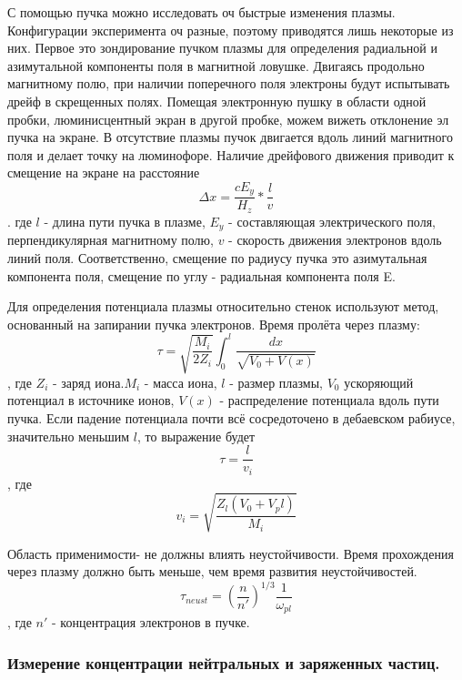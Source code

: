 \documentclass[10pt, a4paper]{article}
\begin{document}
С помощью пучка можно исследовать оч быстрые изменения плазмы. Конфигурации эксперимента оч разные, поэтому приводятся лишь некоторые из них.
Первое это зондирование пучком плазмы для определения радиальной и азимутальной компоненты поля в магнитной ловушке. Двигаясь продольно магнитному полю, при наличии поперечного поля электроны будут испытывать дрейф в скрещенных полях. Помещая электронную пушку в области одной пробки, люминисцентный экран в другой пробке, можем вижеть отклонение эл пучка на экране.
В отсутствие плазмы пучок двигается вдоль линий магнитного поля и делает точку на люминофоре. Наличие дрейфового движения приводит к смещение на экране на расстояние
\begin{equation}
	\Delta x=\frac{cE_y}{H_z} * \frac{l}{v}
\end{equation}
. где $l$ - длина пути пучка в плазме, $E_y$ - составляющая электрического поля, перпендикулярная магнитному полю, $v$ - скорость движения электронов вдоль линий поля.
Соответственно, смещение по радиусу пучка это азимутальная компонента поля, смещение по углу - радиальная компонента поля E.

Для определения потенциала плазмы относительно стенок используют метод, основанный на запирании пучка электронов. Время пролёта через плазму:
\begin{equation}
	\tau = \sqrt{\frac{M_i}{2Z_i}} \int_{0}^{l} \frac{dx}{\sqrt{V_0 +V(x)}}
\end{equation}
, где $Z_i$ - заряд иона.$M_i$ - масса иона, $l$ - размер плазмы, $V_0$ ускоряющий потенциал в источнике ионов, $V(x)$ - распределение потенциала вдоль пути пучка.
Если падение потенциала почти всё сосредоточено в дебаевском рабиусе, значительно меньшим $l$, то выражение будет
\begin{equation}
	\tau = \frac{l}{v_i}
\end{equation}
, где 
\begin{equation}
   v_i= \sqrt{\frac{Z_l (V_0 + V_pl)}{M_i}}
\end{equation}

Область применимости- не должны влиять неустойчивости. Время прохождения через плазму должно быть меньше, чем время развития неустойчивостей.
\begin{equation}
	\tau_{neust} =(\frac{n}{n'})^{1/3} \frac{1}{\omega_{pl}}
\end{equation}
, где $n'$ - концентрация электронов в пучке.




\subsubsection{Измерение концентрации нейтральных и заряженных частиц.}
\end{document}
